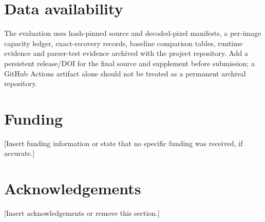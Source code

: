\documentclass[preprint,12pt,a4paper]{elsarticle}
\begin{document}
\section*{Data availability}
The evaluation uses hash-pinned source and decoded-pixel manifests, a per-image capacity ledger, exact-recovery records, baseline comparison tables, runtime evidence and parser-test evidence archived with the project repository. Add a persistent release/DOI for the final source and supplement before submission; a GitHub Actions artifact alone should not be treated as a permanent archival repository.

\section*{Funding}
[Insert funding information or state that no specific funding was received, if accurate.]

\section*{Acknowledgements}
[Insert acknowledgements or remove this section.]



\end{document}
